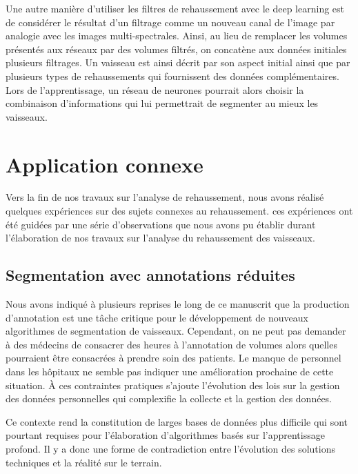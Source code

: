 Une autre manière d'utiliser les filtres de rehaussement avec le deep learning est de considérer le résultat d'un filtrage comme un nouveau canal de l’image par analogie avec les images multi-spectrales. Ainsi, au lieu de remplacer les volumes présentés aux réseaux par des volumes filtrés, on concatène aux données initiales plusieurs filtrages. Un vaisseau est ainsi décrit par son aspect initial ainsi que par plusieurs types de rehaussements qui fournissent des données complémentaires. Lors de l'apprentissage, un réseau de neurones pourrait alors choisir la combinaison d'informations qui lui permettrait de segmenter au mieux les vaisseaux. 

\section{Application connexe}

Vers la fin de nos travaux sur l'analyse de rehaussement, nous avons réalisé quelques expériences sur des sujets connexes au rehaussement. ces expériences ont été guidées par une série d'observations que nous avons pu établir durant l'élaboration de nos travaux sur l'analyse du rehaussement des vaisseaux.

\subsection{Segmentation avec annotations réduites}

Nous avons indiqué à plusieurs reprises le long de ce manuscrit que la production d'annotation est une tâche critique pour le développement de nouveaux algorithmes de segmentation de vaisseaux. Cependant, on ne peut pas demander à des médecins de consacrer des heures à l'annotation de volumes alors quelles pourraient être consacrées à prendre soin des patients. Le manque de personnel dans les hôpitaux ne semble pas indiquer une amélioration prochaine de cette situation. À ces contraintes pratiques s'ajoute l'évolution des lois sur la gestion des données personnelles qui complexifie la collecte et la gestion des données. 

Ce contexte rend la constitution de larges bases de données plus difficile qui sont pourtant requises pour l'élaboration d'algorithmes basés sur l'apprentissage profond. Il y a donc une forme de contradiction entre l'évolution des solutions techniques et la réalité sur le terrain.  

